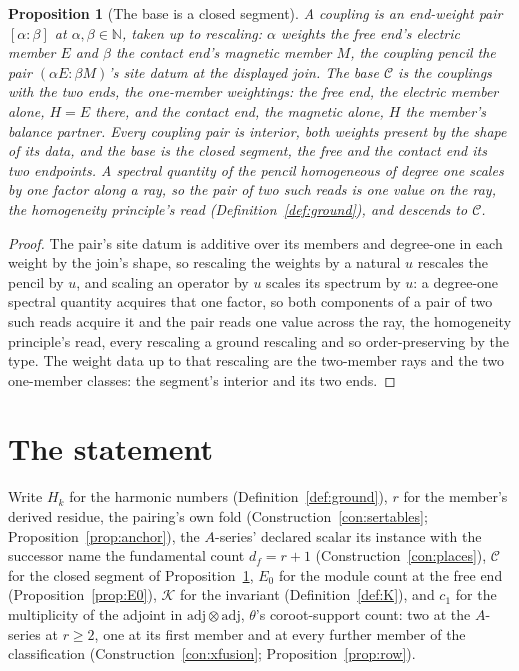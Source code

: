 \documentclass[11pt]{article}
\newtheorem{proposition}{Proposition}
\theoremstyle{definition}
\begin{document}
\begin{proposition}[The base is a closed segment]\label{prop:segment}
A coupling is an \emph{end-weight pair} $[\alpha\!:\!\beta]$ at
$\alpha,\beta\in\mathbb N$, taken up to rescaling: $\alpha$ weights
the free end's electric member $E$ and $\beta$ the contact end's
magnetic member $M$,
the coupling pencil the pair $(\alpha E:\beta M)$'s site datum at
the displayed join. The base
$\mathcal C$ is the couplings with the two \emph{ends}, the
one-member weightings: the \emph{free end}, the electric member
alone, $H=E$ there, and the \emph{contact end}, the magnetic
alone, $H$ the member's balance partner. Every coupling pair is interior,
both weights present by the shape of its data, and the base is the
closed segment, the free and the contact end its two endpoints. A spectral quantity of the
pencil homogeneous of degree one scales by one factor along a ray,
so the pair of two such reads is one value on the ray, the
homogeneity principle's read (Definition~\ref{def:ground}), and
descends to $\mathcal C$.
\end{proposition}
\begin{proof}
The pair's site datum is additive over its members and degree-one
in each weight by the join's shape, so
rescaling the weights by a natural $u$ rescales the pencil by $u$,
and scaling an operator by $u$ scales its spectrum by $u$: a
degree-one spectral quantity acquires that one factor, so both
components of a pair of two such reads acquire it and the pair
reads one value across the ray, the homogeneity principle's
read, every rescaling a ground rescaling and so
order-preserving by the type. The weight data up to that rescaling
are the two-member rays and the two one-member classes: the
segment's interior and its two ends.
\end{proof}


\section{The statement}

Write $H_k$ for the harmonic numbers
(Definition~\ref{def:ground}), $r$ for the member's derived
residue, the pairing's own fold
(Construction~\ref{con:sertables}; Proposition~\ref{prop:anchor}),
the $A$-series' declared scalar its instance with the successor
name the fundamental count $d_f=r+1$
(Construction~\ref{con:places}), $\mathcal C$ for the
closed segment of Proposition~\ref{prop:segment}, $E_0$ for the module count at
the free end (Proposition~\ref{prop:E0}), $\mathcal K$ for the invariant
(Definition~\ref{def:K}), and $c_1$ for the
multiplicity of the adjoint in $\mathrm{adj}\otimes\mathrm{adj}$,
$\theta$'s coroot-support count: two at the $A$-series at
$r\ge2$, one at its first member and at every further member of
the classification
(Construction~\ref{con:xfusion}; Proposition~\ref{prop:row}).
\end{document}
